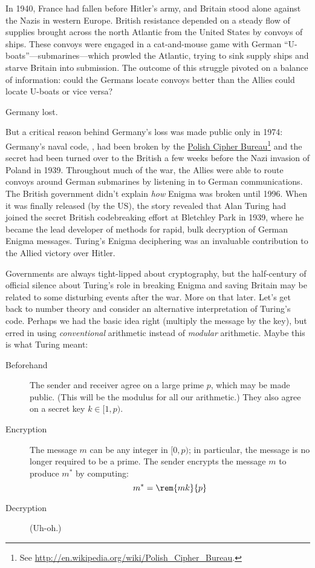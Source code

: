 In 1940, France had fallen before Hitler's army, and Britain stood alone
against the Nazis in western Europe.  British resistance depended on a
steady flow of supplies brought across the north Atlantic from the United
States by convoys of ships.  These convoys were engaged in a cat-and-mouse
game with German ``U-boats''---submarines---which prowled the Atlantic,
trying to sink supply ships and starve Britain into submission.  The
outcome of this struggle pivoted on a balance of information: could the
Germans locate convoys better than the Allies could locate U-boats or vice
versa?

Germany lost.

But a critical reason behind Germany's loss was made public only in
1974: Germany's naval code, , had been broken by the
\href{http://en.wikipedia.org/wiki/Polish_Cipher_Bureau}{Polish Cipher
  Bureau}\footnote{See
  \url{http://en.wikipedia.org/wiki/Polish\_Cipher\_Bureau}.} and the
secret had been turned over to the British a few weeks before the Nazi
invasion of Poland in 1939.  Throughout much of the war, the Allies
were able to route convoys around German submarines by listening in to
German communications.  The British government didn't explain
\emph{how} Enigma was broken until 1996.  When it was finally released
(by the US), the story revealed that Alan Turing had joined the secret
British codebreaking effort at Bletchley Park in 1939, where he became
the lead developer of methods for rapid, bulk decryption of German
Enigma messages.  Turing's Enigma deciphering was an invaluable
contribution to the Allied victory over Hitler.

Governments are always tight-lipped about cryptography, but the
half-century of official silence about Turing's role in breaking
Enigma and saving Britain may be related to some disturbing events
after the war.  More on that later.  Let's get back to number theory
and consider an alternative interpretation of Turing's code.  Perhaps
we had the basic idea right (multiply the message by the key), but
erred in using \emph{conventional} arithmetic instead of
\emph{modular} arithmetic.  Maybe this is what Turing meant:
%
\begin{description}

\item[Beforehand] The sender and receiver agree on a large prime $p$,
which may be made public.  (This will be the modulus for all our
arithmetic.)  They also agree on a secret key $k \in [1, p)$.

\item[Encryption] The message $m$ can be any integer in 
$[0, p)$; in particular, the message is no longer
required to be a prime.  The sender encrypts the message $m$ to
produce $m^*$ by computing:
%
\begin{equation}
m^* = \rem{mk}{p} \label{eq:turing-code}
\end{equation}

\item[Decryption] (Uh-oh.)

\end{description}

